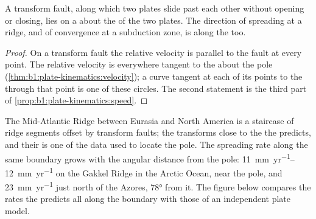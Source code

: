 \begin{proposition}\label{prop:b1:plate-kinematics:transforms}
A transform fault, along which two plates slide past each other without
opening or closing, lies on a  about the  of the two
plates. The direction of spreading at a ridge, and of convergence at a
subduction zone, is along the  too.
\end{proposition}

\begin{proof}
On a transform fault the relative velocity is parallel to the fault at every
point. The relative velocity is everywhere tangent to the  about
the pole (\cref{thm:b1:plate-kinematics:velocity}); a curve tangent at each of
its points to the  through that point is one of these circles. The
second statement is the third part of \cref{prop:b1:plate-kinematics:speed}.
\end{proof}

The Mid-Atlantic Ridge between Eurasia and North America is a staircase of
ridge segments offset by transform faults; the transforms  close to the
 the  predicts, and their  is one of the data used to
locate the pole. The spreading rate along the same boundary grows with the
angular distance from the pole: \qtyrange{11}{12}{mm.yr^{-1}} on the Gakkel
Ridge in the Arctic Ocean, near the pole, and \qty{23}{mm.yr^{-1}} just north
of the Azores, \ang{78} from it. The figure below compares the rates the  predicts all along the boundary with those of an independent plate model.

